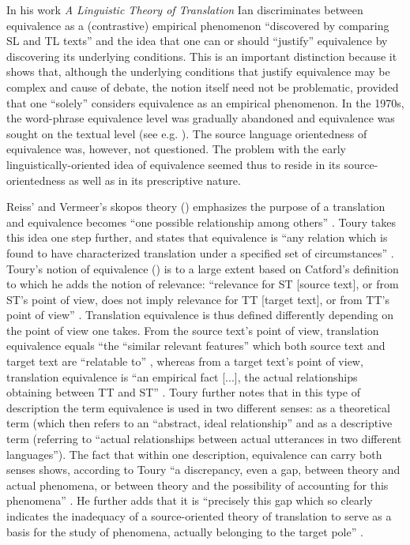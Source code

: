 In his work \textit{A Linguistic Theory of Translation} Ian \citet{catford_linguistic_1965} discriminates between equivalence as a (contrastive) empirical phenomenon “discovered by comparing SL and TL texts” \citep[27]{catford_linguistic_1965} and the idea that one can or should ``justify'' equivalence by discovering its underlying conditions. This is an important distinction because it shows that, although the underlying conditions that justify equivalence may be complex and cause of debate, the notion itself need not be problematic, provided that one ``solely'' considers equivalence as an empirical phenomenon. In the 1970s, the word-phrase equivalence level was gradually abandoned and equivalence was sought on the textual level (see e.g. \citealt{koller_einfuhrung_1979}). The source language orientedness of equivalence was, however, not questioned. The problem with the early linguistically-oriented idea of equivalence seemed thus to reside in its source-orientedness as well as in its prescriptive nature.

Reiss’ and Vermeer’s skopos theory (\citeyear{reiss_grundlegung_1991}) emphasizes the purpose of a translation and equivalence becomes “one possible relationship among others” \citep[5]{schaffner_concept_1999}. Toury takes this idea one step further, and states that equivalence is “any relation which is found to have characterized translation under a specified set of circumstances” \citep[61]{toury_descriptive_1995}. Toury’s notion of equivalence (\citeyear[37 ff.]{toury_search_1980}) is to a large extent based on Catford’s definition to which he adds the notion of relevance: “relevance for ST [source text], or from ST’s point of view, does not imply relevance for TT [target text], or from TT’s point of view” \citep[11]{toury_search_1980}. Translation equivalence is thus defined differently depending on the point of view one takes. From the source text’s point of view, translation equivalence equals “the “similar relevant features” which both source text and target text are “relatable to” \citep[38]{toury_search_1980}, whereas from a target text’s point of view, translation equivalence is “an empirical fact [...], the actual relationships obtaining between TT and ST” \citep[39]{toury_search_1980}. Toury further notes that in this type of description the term equivalence is used in two different senses: as a theoretical term (which then refers to an “abstract, ideal relationship” and as a descriptive term (referring to “actual relationships between actual utterances in two different languages”). The fact that within one description, equivalence can carry both senses shows, according to Toury “a discrepancy, even a gap, between theory and actual phenomena, or between theory and the possibility of accounting for this phenomena” \citep[39]{toury_search_1980}. He further adds that it is “precisely this gap which so clearly indicates the inadequacy of a source-oriented theory of translation to serve as a basis for the study of phenomena, actually belonging to the target pole” \citep[39]{toury_search_1980}.

